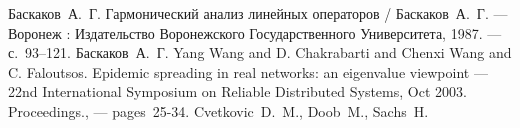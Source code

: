 \begin{thebibliography}{9}
  Баскаков~А.~Г. Гармонический анализ линейных операторов
    / Баскаков~А.~Г.
    --- Воронеж : Издательство Воронежского Государственного Университета,
        1987.
    ---  с.~93--121.
 Баскаков~А.~Г.
  Yang Wang and D. Chakrabarti and Chenxi Wang and C. Faloutsos.
    Epidemic spreading in real networks: an eigenvalue viewpoint
        --- 22nd International Symposium on Reliable Distributed Systems, Oct 2003. Proceedings., --- pages~25-34.
    Cvetkovic~D.~M., Doob~M., Sachs~H.

\end{thebibliography}


